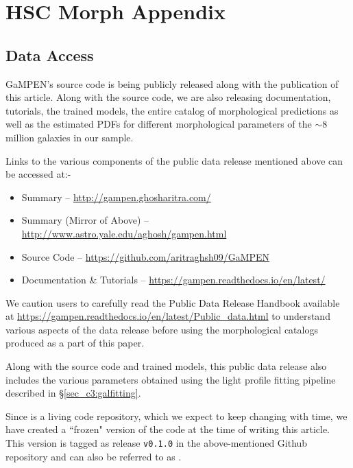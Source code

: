 
\chapter*{HSC Morph Appendix}\label{ch:hsc_morph_appendix}

\section{Data Access}\label{sec_c3:ap:data_access}

GaMPEN's source code is being publicly released along with the publication of this article. Along with the source code, we are also releasing documentation, tutorials, the trained models, the entire catalog of morphological predictions as well as the estimated PDFs for different morphological parameters of the $\sim8$ million galaxies in our sample. 

\vspace{10pt}
Links to the various components of the public data release mentioned above can be accessed at:-
\begin{itemize}
    \item Summary -- \href{http://gampen.ghosharitra.com/}{\url{http://gampen.ghosharitra.com/}}
    \item Summary (Mirror of Above) --\href{http://www.astro.yale.edu/aghosh/gampen.html}{\url{http://www.astro.yale.edu/aghosh/gampen.html}}
    \item Source Code --
    \href{https://github.com/aritraghsh09/GaMPEN}{\url{https://github.com/aritraghsh09/GaMPEN}}
    \item Documentation \& Tutorials -- 
    \href{https://gampen.readthedocs.io/en/latest/}{\url{https://gampen.readthedocs.io/en/latest/}}
\end{itemize}

We caution users to carefully read the Public Data Release Handbook available at \href{https://gampen.readthedocs.io/en/latest/Public_data.html}{\url{https://gampen.readthedocs.io/en/latest/Public_data.html}} to understand various aspects of the data release before using the morphological catalogs produced as a part of this paper. 

Along with the source code and trained models, this public data release also includes the various parameters obtained using the light profile fitting pipeline described in \S \ref{sec_c3:galfitting}.

Since \gampen{} is a living code repository, which we expect to keep changing with time, we have created a ``frozen" version of the code at the time of writing this article. This version is tagged as release \texttt{v0.1.0} in the above-mentioned Github repository and can also be referred to as \citet{gampen_first_release}.

